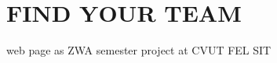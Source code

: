 \chapter{FIND YOUR TEAM}
\hypertarget{md__r_e_a_d_m_e}{}\label{md__r_e_a_d_m_e}
\label{md__r_e_a_d_m_e_autotoc_md0}%
%
 web page as ZWA semester project at CVUT FEL SIT 